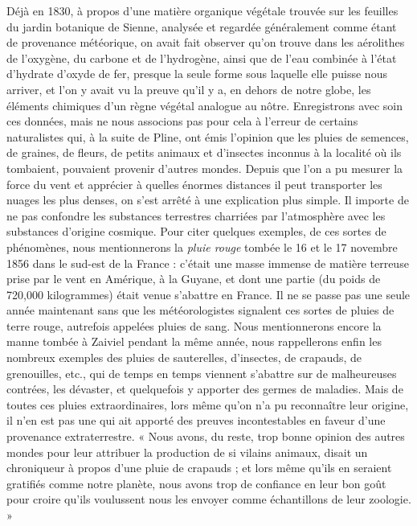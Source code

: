 \documentclass[a4paper, 11pt, oneside]{article}
\begin{document}
Déjà en 1830, à propos d'une matière organique végétale trouvée sur les feuilles du jardin botanique de Sienne, analysée et regardée généralement comme étant de provenance météorique, on avait fait observer qu'on trouve dans les aérolithes de l'oxygène, du carbone et de l'hydrogène, ainsi que de l'eau combinée à l'état d'hydrate d'oxyde de fer, presque la seule forme sous laquelle elle puisse nous arriver, et l'on y avait vu la preuve qu'il y a, en dehors de notre globe, les éléments chimiques d'un règne végétal analogue au nôtre. Enregistrons avec soin ces données, mais ne nous associons pas pour cela à l'erreur de certains naturalistes qui, à la suite de Pline, ont émis l'opinion que les pluies de semences, de graines, de fleurs, de petits animaux et d'insectes inconnus à la localité où ils tombaient, pouvaient provenir d'autres mondes. Depuis que l'on a pu mesurer la force du vent et apprécier à quelles énormes distances il peut transporter les nuages les plus denses, on s'est arrêté à une explication plus simple. Il importe de ne pas confondre les substances terrestres charriées par l'atmosphère avec les substances d'origine cosmique. Pour citer quelques exemples, de ces sortes de phénomènes, nous mentionnerons la \emph{pluie rouge} tombée le 16 et le 17 novembre 1856 dans le sud-est de la France : c'était une masse immense de matière terreuse prise par le vent en Amérique, à la Guyane, et dont une partie (du poids de 720,000 kilogrammes) était venue s'abattre en France. Il ne se passe pas une seule année maintenant sans que les météorologistes signalent ces sortes de pluies de terre rouge, autrefois appelées pluies de sang. Nous mentionnerons encore la manne tombée à Zaiviel pendant la même année, nous rappellerons enfin les nombreux exemples des pluies de sauterelles, d'insectes, de crapauds, de grenouilles, etc., qui de temps en temps viennent s'abattre sur de malheureuses contrées, les dévaster, et quelquefois y apporter des germes de maladies. Mais de toutes ces pluies extraordinaires, lors même qu'on n'a pu reconnaître leur origine, il n'en est pas une qui ait apporté des preuves incontestables en faveur d'une provenance extraterrestre. « Nous avons, du reste, trop bonne opinion des autres mondes pour leur attribuer la production de si vilains animaux, disait un chroniqueur à propos d'une pluie de crapauds ; et lors même qu'ils en seraient gratifiés comme notre planète, nous avons trop de confiance en leur bon goût pour croire qu'ils voulussent nous les envoyer comme échantillons de leur zoologie. »
\end{document}
